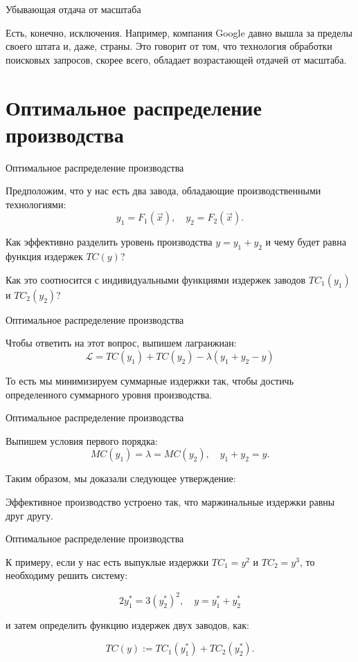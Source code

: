 \documentclass{beamer}
\begin{document}
\begin{frame}{Убывающая отдача от масштаба}

Есть, конечно, исключения. Например, компания Google давно вышла за пределы своего штата и, даже, страны. Это говорит от том, что технология обработки поисковых запросов, скорее всего, обладает возрастающей отдачей от масштаба.

\end{frame}

\section{Оптимальное распределение производства}

\begin{frame}{Оптимальное распределение производства}

Предположим, что у нас есть два завода, обладающие производственными технологиями:
$$ y_1 = F_1(\vec x), \quad y_2 = F_2(\vec x).$$

Как эффективно разделить уровень производства $y = y_1 + y_2$ и чему будет равна функция издержек $TC(y)$? 

Как это соотносится с индивидуальными функциями издержек заводов $TC_1(y_1)$ и $TC_2(y_2)$?

\end{frame}

\begin{frame}{Оптимальное распределение производства}

Чтобы ответить на этот вопрос, выпишем лагранжиан:
$$ \mathcal{L} = TC(y_1) + TC(y_2) - \lambda (y_1 + y_2 - y)$$

То есть мы минимизируем суммарные издержки так, чтобы достичь определенного суммарного уровня производства.

\end{frame}

\begin{frame}{Оптимальное распределение производства}

Выпишем условия первого порядка:
$$ MC(y_1) = \lambda = MC(y_2), \quad y_1 + y_2 = y.$$

Таким образом, мы доказали следующее утверждение:
\begin{lemma}
Эффективное производство устроено так, что маржинальные издержки равны друг другу.
\end{lemma}

\end{frame}

\begin{frame}{Оптимальное распределение производства}

К примеру, если у нас есть выпуклые издержки $TC_1 = y^2$ и $TC_2 = y^3$, то необходиму решить систему:

$$ 2y_1^{\ast} = 3(y_2^{\ast})^2, \quad y = y_1^{\ast} + y_2^{\ast}$$

и затем определить функцию издержек двух заводов, как:

$$ TC(y) := TC_1(y_1^{\ast}) + TC_2(y_2^{\ast}).$$

\end{frame}
\end{document}
